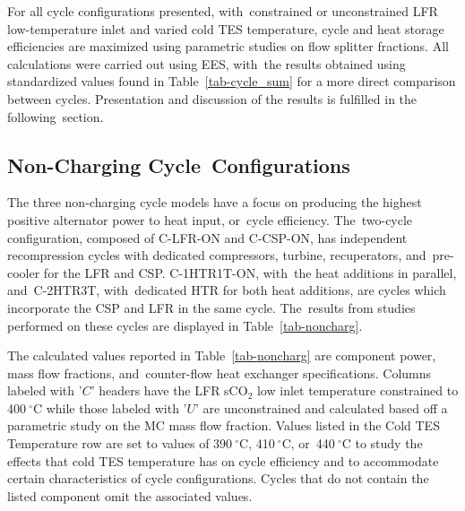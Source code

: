 \documentclass[sustainability,article,accept,moreauthors,pdftex]{Definitions/mdpi}
\newcommand{\mw}[1]{\comment[id=MW]{#1}}
\begin{document}
\begin{paracol}{2}
For all cycle configurations presented, with~constrained or unconstrained LFR low-temperature inlet and varied cold TES temperature, cycle and heat storage efficiencies are maximized using parametric studies on flow splitter fractions. %
{All calculations were carried out using EES, with~the results}
obtained using standardized values found in \mbox{Table \ref{tab-cycle_sum}} for a more direct comparison between cycles. Presentation and discussion of the results is fulfilled in the following~section. 

\subsection{Non-Charging Cycle~Configurations}

The three non-charging cycle models have a focus on producing the highest positive alternator power to heat input, or~cycle efficiency. The~two-cycle configuration, composed of C-LFR-ON and C-CSP-ON, has independent recompression cycles with dedicated compressors, turbine, recuperators, and~pre-cooler for the LFR and CSP. C-1HTR1T-ON, with~the heat additions in parallel, and~C-2HTR3T, with~dedicated HTR for both heat additions, are cycles which incorporate the CSP and LFR in the same cycle. The~results from studies performed on these cycles are displayed in Table~\ref{tab-noncharg}. 

The calculated values reported in Table~\ref{tab-noncharg} are component power, mass flow fractions, and~counter-flow heat exchanger specifications. Columns labeled with '$C$' headers have the LFR sCO$_2$ low inlet temperature constrained to 400$~^{\circ}$C while those labeled with '$U$' are unconstrained and calculated based off a parametric study on the MC mass flow fraction. Values listed in the Cold TES Temperature row are set to values of 390$~^{\circ}$C, 410$~^{\circ}$C, or~440$~^{\circ}$C to study the effects that cold TES temperature has on cycle efficiency and to accommodate certain characteristics of cycle configurations. %
{Cycles that do not contain the listed component omit the associated values.}
\clearpage 
\end{paracol}
\end{document}
